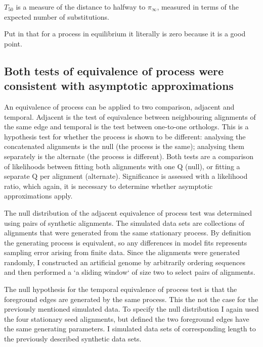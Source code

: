 ${T_{50}}$ is a measure of the distance to halfway to $\pi_\infty$, measured in terms of the expected number of substitutions. 

Put in that for a process in equilibrium it literally is zero because it is a good point.



\subsection*{Both tests of equivalence of process were consistent with asymptotic approximations}

An equivalence of process can be applied to two comparison, adjacent and temporal. Adjacent is the test of equivalence between neighbouring alignments of the same edge and temporal is the test between one-to-one orthologs. This is a hypothesis test for whether the process is shown to be different: analysing the concatenated alignments is the null (the process is the same); analysing them separately is the alternate (the process is different). Both tests are a comparison of likelihoods between fitting both alignments with one $\mathrm{Q}$ (null), or fitting a separate $\mathrm{Q}$ per alignment (alternate). Significance is assessed with a likelihood ratio, which again, it is necessary to determine whether asymptotic approximations apply. 

The null distribution of the adjacent equivalence of process test was determined using pairs of synthetic alignments. The simulated data sets are collections of alignments that were generated from the same stationary process. By definition the generating process is equivalent, so any differences in model fits represents sampling error arising from finite data. Since the alignments were generated randomly, I constructed an artificial genome by arbitrarily ordering sequences and then performed a `a sliding window` of size two to select pairs of alignments.

The null hypothesis for the temporal equivalence of process test is that the foreground edges are generated by the same process. This the not the case for the previously mentioned simulated data. To specify the null distribution I again used the four stationary seed alignments, but defined the two foreground edges have the same generating parameters. I simulated data sets of corresponding length to the previously described synthetic data sets. 

